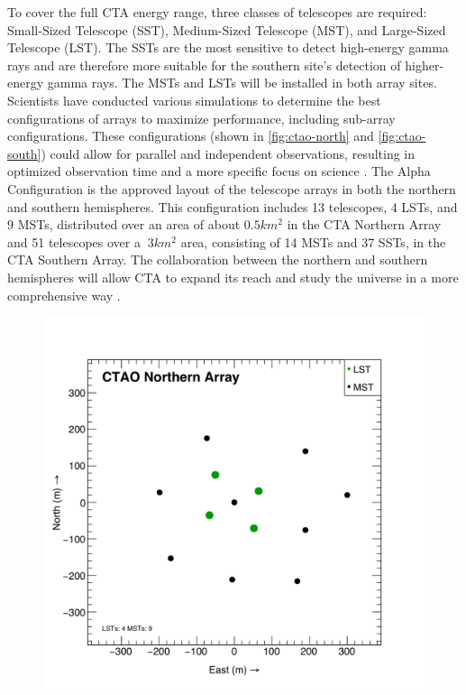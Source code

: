 To cover the full CTA energy range, three classes of telescopes are required: Small-Sized Telescope (SST), Medium-Sized Telescope (MST), and Large-Sized Telescope (LST). The SSTs are the most sensitive to detect high-energy gamma rays and are therefore more suitable for the southern site's detection of higher-energy gamma rays. The MSTs and LSTs will be installed in both array sites. Scientists have conducted various simulations to determine the best configurations of arrays to maximize performance, including sub-array configurations. These configurations (shown in \autoref{fig:ctao-north} and \autoref{fig:ctao-south}) could allow for parallel and independent observations, resulting in optimized observation time and a more specific focus on science \cite{Acharyya201935}. The Alpha Configuration is the approved layout of the telescope arrays in both the northern and southern hemispheres. This configuration includes 13 telescopes, 4 LSTs, and 9 MSTs, distributed over an area of about $0.5 km^2$ in the CTA Northern Array and 51 telescopes over a $~3 km^2$ area, consisting of 14 MSTs and 37 SSTs, in the CTA Southern Array. The collaboration between the northern and southern hemispheres will allow CTA to expand its reach and study the universe in a more comprehensive way \cite{Acharyya201935}. 
\begin{figure}[ht]
\centering
\includegraphics[width=0.8\linewidth]{figures/introduction/ctao-north.png}
\label{fig:ctao-north}
\end{figure}
